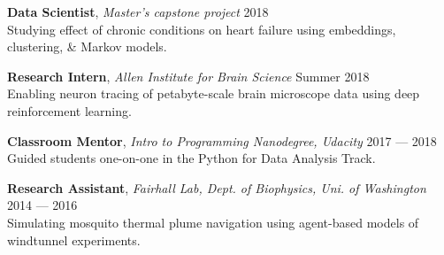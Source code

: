 \documentclass[a4paper,12pt]{article}
\newcommand{\resheading}[1]{{\vspace*{.001in} \colorbox{mygrey}{\begin{minipage}{\textwidth}{\textmd{\large \textbf{#1} \vphantom{p\^{E}}}}\end{minipage}}} }
\newcommand{\ressubheading}[4]{
        \textbf{#1} \hfill #2\\
        \textit{#3} \hfill #4 \\}
\begin{document}
{\setlength{\parskip}{8pt}

\textbf{Data Scientist}, \textit{Master's capstone project} \hfill 2018\\
Studying effect of chronic conditions on heart failure using embeddings, clustering, \& Markov models.

\textbf{Research Intern}, \textit{Allen Institute for Brain Science} \hfill Summer 2018\\
Enabling neuron tracing of petabyte-scale brain microscope data using deep reinforcement learning.


\textbf{Classroom Mentor}, \textit{Intro to Programming Nanodegree, Udacity} \hfill 2017 --- 2018\\
Guided students one-on-one in the Python for Data Analysis Track.

\textbf{Research Assistant}, \textit{Fairhall Lab, Dept. of Biophysics, Uni. of Washington} \hfill 2014 --- 2016\\
Simulating mosquito thermal plume navigation using agent-based models of windtunnel experiments.\\


}
%
%
%
%
\end{document}

